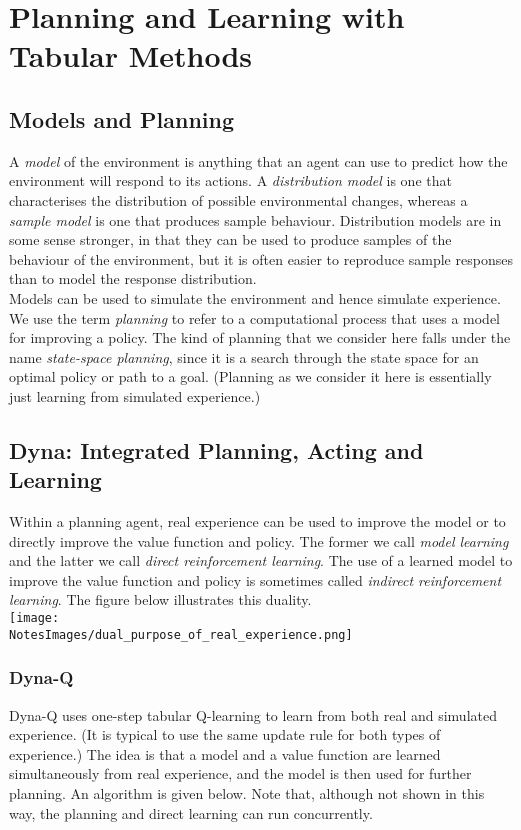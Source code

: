\section{Planning and Learning with Tabular Methods}


\subsection{Models and Planning}
A \emph{model} of the environment is anything that an agent can use to predict how the environment will respond to its actions. A \emph{distribution model} is one that characterises the distribution of possible environmental changes, whereas a \emph{sample model} is one that produces sample behaviour. Distribution models are in some sense stronger, in that they can be used to produce samples of the behaviour of the environment, but it is often easier to reproduce sample responses than to model the response distribution.\\

Models can be used to simulate the environment and hence simulate experience. We use the term \emph{planning} to refer to a computational process that uses a model for improving a policy. The kind of planning that we consider here falls under the name \emph{state-space planning}, since it is a search through the state space for an optimal policy or path to a goal. (Planning as we consider it here is essentially just learning from simulated experience.)

\subsection{Dyna: Integrated Planning, Acting and Learning}
Within a planning agent, real experience can be used to improve the model or to directly improve the value function and policy. The former we call \emph{model learning} and the latter we call \emph{direct reinforcement learning}. The use of a learned model to improve the value function and policy is sometimes called \emph{indirect reinforcement learning}. The figure below illustrates this duality.\\
\texttt{[image: \\NotesImages/dual\_purpose\_of\_real\_experience.png]}\\

\subsubsection*{Dyna-Q}
Dyna-Q uses one-step tabular Q-learning to learn from both real and simulated experience. (It is typical to use the same update rule for both types of experience.) The idea is that a model and a value function are learned simultaneously from real experience, and the model is then used for further planning. An algorithm is given below. Note that, although not shown in this way, the planning and direct learning can run concurrently.\\

